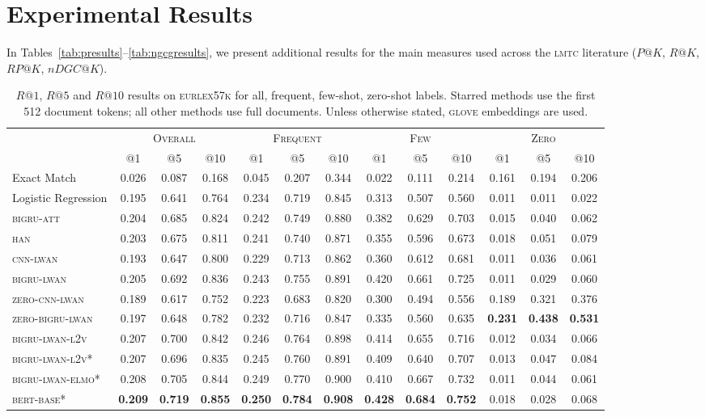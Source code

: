 \documentclass[11pt,a4paper]{article}
\newcommand{\bigruatt}{\textsc{bigru-att}\xspace}
\newcommand{\han}{\textsc{han}\xspace}
\newcommand{\lmtc}{\textsc{lmtc}\xspace}
\newcommand{\lwancnn}{\textsc{cnn-lwan}\xspace}
\newcommand{\zlwancnn}{\textsc{zero-cnn-lwan}\xspace}
\newcommand{\lwangru}{\textsc{bigru-lwan}\xspace}
\newcommand{\lwangrulv}{\textsc{bigru-lwan-l2v}}
\newcommand{\lwangruelmo}{\textsc{bigru-lwan-elmo}}
\newcommand{\zlwangru}{\textsc{zero-bigru-lwan}\xspace}
\newcommand{\glove}{\textsc{glove}\xspace}
\newcommand{\bertbase}{\textsc{bert-base}\xspace}
\newcommand{\newdata}{\textsc{eurlex57k}\xspace}
\begin{document}
\section{Experimental Results}
\label{app:experiments}
In Tables~\ref{tab:presults}--\ref{tab:ngcgresults}, we present additional results
for the main measures used across the \lmtc literature ($P@K$, $R@K$, $RP@K$, $nDGC@K$).
\vspace{-2mm}

\begin{table*}[h!]
\centering
{
\footnotesize\addtolength{\tabcolsep}{-2pt}
\begin{tabular}{lcccccccccccc}
  \hline
  & \multicolumn{3}{c}{\textsc{Overall}} & \multicolumn{3}{c}{\textsc{Frequent}} & \multicolumn{3}{c}{\textsc{Few}} & \multicolumn{3}{c}{\textsc{Zero}} \\ 
  & @1 & @5 & @10 & @1 & @5 & @10 & @1 & @5 & @10 & @1 & @5 & @10 \\
  \cline{2-13}
  Exact Match & 0.026 & 0.087 & 0.168 & 0.045 & 0.207 & 0.344 & 0.022 & 0.111 & 0.214 & 0.161 & 0.194 & 0.206 \\
  Logistic Regression & 0.195 & 0.641 & 0.764 & 0.234 & 0.719 & 0.845 & 0.313 & 0.507 & 0.560 & 0.011 & 0.011 & 0.022 \\
  \hline
  \bigruatt & 0.204 & 0.685 & 0.824 & 0.242 & 0.749 & 0.880 & 0.382 & 0.629 & 0.703 & 0.015 & 0.040 & 0.062 \\
  \han & 0.203 & 0.675 & 0.811 & 0.241 & 0.740 & 0.871 & 0.355 & 0.596 & 0.673 & 0.018 & 0.051 & 0.079 \\
  \hline
 \lwancnn & 0.193 & 0.647 & 0.800 & 0.229 & 0.713 & 0.862 & 0.360 & 0.612 & 0.681 & 0.011 & 0.036 & 0.061 \\
  \lwangru & 0.205 & 0.692 & 0.836 & 0.243 & 0.755 & 0.891 & 0.420 & 0.661 & 0.725 & 0.011 & 0.029 & 0.060 \\
   \hline
  \zlwancnn & 0.189 & 0.617 & 0.752 & 0.223 & 0.683 & 0.820 & 0.300 & 0.494 & 0.556 & 0.189 & 0.321 & 0.376 \\
  \zlwangru & 0.197 & 0.648 & 0.782 & 0.232 & 0.716 & 0.847 & 0.335 & 0.560 & 0.635 & \textbf{0.231} & \textbf{0.438} & \textbf{0.531} \\
  \hline\hline
   \lwangrulv & 0.207 & 0.700 & 0.842 & 0.246 & 0.764 & 0.898 & 0.414 & 0.655 & 0.716 & 0.012 & 0.034 & 0.066 \\
\hline
\lwangrulv* & 0.207 & 0.696 & 0.835 & 0.245 & 0.760 & 0.891 & 0.409 & 0.640 & 0.707 & 0.013 & 0.047 & 0.084 \\
\lwangruelmo* & 0.208 & 0.705 & 0.844 & 0.249 & 0.770 & 0.900 & 0.410 & 0.667 & 0.732 & 0.011 & 0.044 & 0.061 \\
  \bertbase* & \textbf{0.209} & \textbf{0.719} & \textbf{0.855} & \textbf{0.250} & \textbf{0.784} & \textbf{0.908} & \textbf{0.428} & \textbf{0.684} & \textbf{0.752} & 0.018 & 0.028 & 0.068 \\
  \hline
\end{tabular}
}
\caption{$R@1$, $R@5$ and $R@10$ results on \newdata for all, frequent, few-shot, zero-shot labels. Starred methods use the first 512 document tokens; all other methods use full documents. Unless otherwise stated, \glove embeddings are used.}
\label{tab:rresults}
\end{table*}
\end{document}
